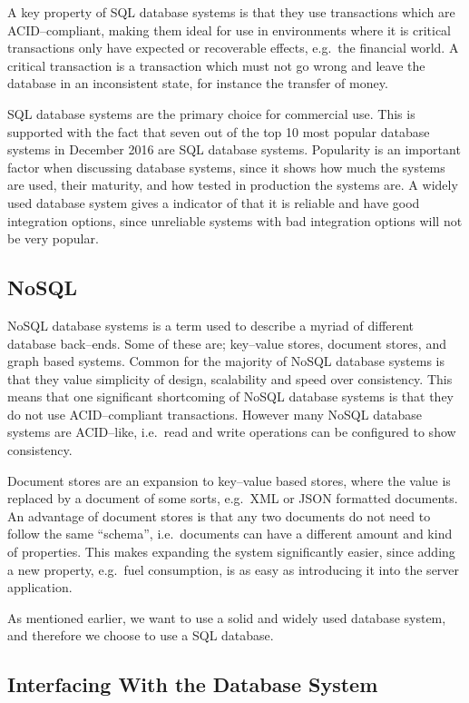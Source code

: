 A key property of SQL database systems is that they use transactions which are ACID--compliant\cite{Haerder:1983:PTD:289.291}, making them ideal for use in environments where it is critical transactions only have expected or recoverable effects, e.g.~the financial world.
A critical transaction is a transaction which must not go wrong and leave the database in an inconsistent state, for instance the transfer of money.

SQL database systems are the primary choice for commercial use\cite{dbs_concepts}.
This is supported with the fact that seven out of the top 10 most popular database systems in December 2016 are SQL database systems\cite{DB_RANKINGS}.
Popularity is an important factor when discussing database systems, since it shows how much the systems are used, their maturity, and how tested in production the systems are.
A widely used database system gives a indicator of that it is reliable and have good integration options,
since unreliable systems with bad integration options will not be very popular. 

\subsection{NoSQL}
NoSQL database systems is a term used to describe a myriad of different database back--ends.
Some of these are; key--value stores, document stores, and graph based systems.
Common for the majority of NoSQL database systems is that they value simplicity of design, scalability and speed over consistency.
This means that one significant shortcoming of NoSQL database systems is that they do not use ACID--compliant transactions.
However many NoSQL database systems are ACID--like, i.e.~read and write operations can be configured to show consistency.

Document stores are an expansion to key--value based stores, where the value is replaced by a document of some sorts, e.g.~XML or JSON formatted documents.
An advantage of document stores is that any two documents do not need to follow the same ``schema'', i.e.~documents can have a different amount and kind of properties.
This makes expanding the system significantly easier, since adding a new property, e.g.~fuel consumption, is as easy as introducing it into the server application.

\bigskip
As mentioned earlier, we want to use a solid and widely used database system, and therefore we choose to use a SQL database.

\subsection{Interfacing With the Database System} %

